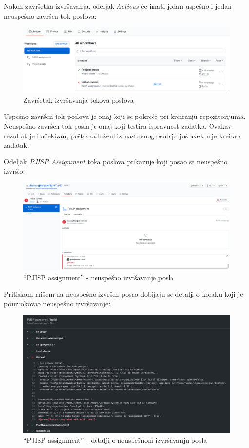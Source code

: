 \documentclass[12pt]{report}
\begin{document}
Nakon završetka izvršavanja, odeljak \textit{Actions} će imati jedan uspešno i jedan neuspešno završen tok poslova:

\begin{figure}[H]
    \centering
    \includegraphics[width=\linewidth]{images/9.png}
    \caption{Završetak izvršavanja tokova poslova}
\end{figure}

Uspešno završen tok poslova je onaj koji se pokreće pri kreiranju repozitorijuma. Neuspešno završen tok posla je onaj koji testira ispravnost zadatka. Ovakav rezultat je i očekivan, pošto zaduženi iz nastavnog osoblja još uvek nije kreirao zadatak.

Odeljak \textit{PJISP Assignment} toka poslova prikazuje koji posao se neuspešno izvršio:

\begin{figure}[H]
    \centering
    \includegraphics[width=\linewidth]{images/10.png}
    \caption{``PJISP assignment'' - neuspešno izvršavanje posla}
\end{figure}

Pritiskom mišem na neuspešno izvršen posao dobijaju se detalji o koraku koji je pouzrokovao neuspešno izvršavanje:

\begin{figure}[H]
    \centering
    \includegraphics[width=\linewidth]{images/11.png}
    \caption{``PJISP assignment'' - detalji o neuspešnom izvršavanju posla}
\end{figure}
\end{document}
